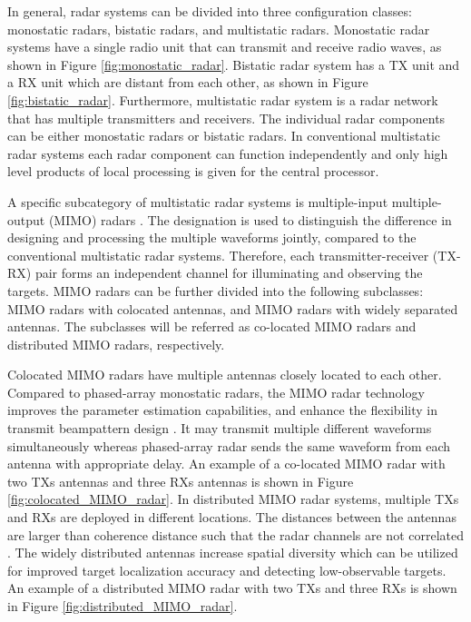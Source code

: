 \documentclass[english, 12pt, a4paper, elec, utf8, a-1b, online]{aaltothesis}
\begin{document}
In general, radar systems can be divided into three configuration classes: monostatic radars, bistatic radars, and multistatic radars.
Monostatic radar systems have a single radio unit that can transmit and receive radio waves, as shown in Figure \ref{fig:monostatic_radar}.
Bistatic radar system has a TX unit and a RX unit which are distant from each other, as shown in Figure \ref{fig:bistatic_radar}.
Furthermore, multistatic radar system is a radar network that has multiple transmitters and receivers.
The individual radar components can be either monostatic radars or bistatic radars.
In conventional multistatic radar systems each radar component can function independently and only high level products of local processing is given for the central processor.

A specific subcategory of multistatic radar systems is multiple-input multiple-output (MIMO) radars \cite{Haimovich2008}.
The designation is used to distinguish the difference in designing and processing the multiple waveforms jointly, compared to the conventional multistatic radar systems.
Therefore, each transmitter-receiver (TX-RX) pair forms an independent
channel for illuminating and observing the targets.
MIMO radars can be further divided into the following subclasses: MIMO radars with colocated antennas, and MIMO radars with widely separated antennas.
The subclasses will be referred as co-located MIMO radars and distributed MIMO radars, respectively.

Colocated MIMO radars have multiple antennas closely located to each other.
Compared to phased-array monostatic radars, the MIMO radar technology improves the parameter estimation capabilities, and enhance the flexibility in transmit beampattern design \cite{Li2007}.
It may transmit multiple different waveforms simultaneously whereas phased-array radar sends the same waveform from each antenna with appropriate delay.
An example of a co-located MIMO radar with two TXs antennas and three RXs antennas is shown in Figure \ref{fig:colocated_MIMO_radar}.
In distributed MIMO radar systems, multiple TXs and RXs are deployed in different locations.
The distances between the antennas are larger than coherence distance such that the radar channels are not correlated \cite{Haimovich2008}.
The widely distributed antennas increase spatial diversity which can be utilized for improved target localization accuracy and detecting low-observable targets.
An example of a distributed MIMO radar with two TXs and three RXs is shown in Figure \ref{fig:distributed_MIMO_radar}.
\end{document}
